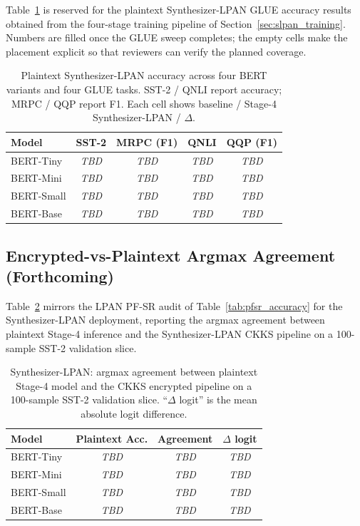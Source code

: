 Table~\ref{tab:slpan_glue} is reserved for the plaintext Synthesizer-LPAN GLUE accuracy results obtained from the four-stage training pipeline of Section~\ref{sec:slpan_training}. Numbers are filled once the GLUE sweep completes; the empty cells make the placement explicit so that reviewers can verify the planned coverage.

\begin{table}[htbp]
\centering
\caption{Plaintext Synthesizer-LPAN accuracy across four BERT variants and four GLUE tasks. SST-2 / QNLI report accuracy; MRPC / QQP report F1. Each cell shows baseline / Stage-4 Synthesizer-LPAN / $\Delta$.}
\label{tab:slpan_glue}
\begin{tabular}{lcccc}
\toprule
\textbf{Model} & \textbf{SST-2} & \textbf{MRPC (F1)} & \textbf{QNLI} & \textbf{QQP (F1)} \\
\midrule
BERT-Tiny  & \textit{TBD} & \textit{TBD} & \textit{TBD} & \textit{TBD} \\
BERT-Mini  & \textit{TBD} & \textit{TBD} & \textit{TBD} & \textit{TBD} \\
BERT-Small & \textit{TBD} & \textit{TBD} & \textit{TBD} & \textit{TBD} \\
BERT-Base  & \textit{TBD} & \textit{TBD} & \textit{TBD} & \textit{TBD} \\
\bottomrule
\end{tabular}
\end{table}

\subsection{Encrypted-vs-Plaintext Argmax Agreement (Forthcoming)}

Table~\ref{tab:slpan_pfsr_accuracy} mirrors the LPAN PF-SR audit of Table~\ref{tab:pfsr_accuracy} for the Synthesizer-LPAN deployment, reporting the argmax agreement between plaintext Stage-4 inference and the Synthesizer-LPAN CKKS pipeline on a 100-sample SST-2 validation slice.

\begin{table}[htbp]
\centering
\caption{Synthesizer-LPAN: argmax agreement between plaintext Stage-4 model and the CKKS encrypted pipeline on a 100-sample SST-2 validation slice. ``$\Delta$ logit'' is the mean absolute logit difference.}
\label{tab:slpan_pfsr_accuracy}
\begin{tabular}{lccc}
\toprule
\textbf{Model} & \textbf{Plaintext Acc.} & \textbf{Agreement} & \textbf{$\Delta$ logit} \\
\midrule
BERT-Tiny  & \textit{TBD} & \textit{TBD} & \textit{TBD} \\
BERT-Mini  & \textit{TBD} & \textit{TBD} & \textit{TBD} \\
BERT-Small & \textit{TBD} & \textit{TBD} & \textit{TBD} \\
BERT-Base  & \textit{TBD} & \textit{TBD} & \textit{TBD} \\
\bottomrule
\end{tabular}
\end{table}

